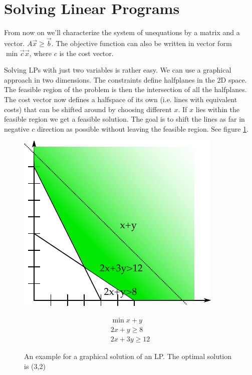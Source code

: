 \section{Solving Linear Programs}
From now on we'll characterize the system of unequations by a matrix and a vector. $A\vec x \geq \vec b$. The objective function can also be written in vector form $\min \vec c \vec x$, where $c$ is the cost vector.

Solving LPs with just two variables is rather easy. We can use a graphical approach in two dimensions. The constraints define halfplanes in the 2D space. The feasible region of the problem is then the intersection of all the halfplanes. The cost vector now defines a halfspace of its own (i.e. lines with equivalent costs) that can be shifted around by choosing different $x$. If $x$ lies within the feasible region we get a feasible solution. The goal is to shift the lines as far in negative $c$ direction as possible without leaving the feasible region. See figure \ref{Fig:graphSolutionEx}.

\begin{figure}[hbt]
\begin{minipage}[hbt]{0.4\linewidth}
\includegraphics{./images/graphSolutionEx.pdf}
\end{minipage}
\hfill
\begin{minipage}[hbt]{0.4\linewidth}
\begin{align*}
\min x+y\\
2x+y\geq 8\\
2x+3y\geq 12
\end{align*}
\end{minipage}
\caption{An example for a graphical solution of an LP. The optimal solution is (3,2)}
\label{Fig:graphSolutionEx}
\end{figure}

